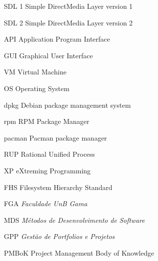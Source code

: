 \begin{siglas}
  \item[SDL 1] Simple DirectMedia Layer version 1
  \item[SDL 2] Simple DirectMedia Layer version 2
  \item[API] Application Program Interface
  \item[GUI] Graphical User Interface
  \item[VM] Virtual Machine
  \item[OS] Operating System
  \item[dpkg] Debian package management system
  \item[rpm] RPM Package Manager
  \item[pacman] Pacman package manager
  \item[RUP] Rational Unified Process
  \item[XP] eXtreming Programming
  \item[FHS] Filesystem Hierarchy Standard
  \item[FGA] \textit{Faculdade UnB Gama}
  \item[MDS] \textit{M\'etodos de Desenvolvimento de Software}
  \item[GPP] \textit{Gest\~ao de Portfolios e Projetos}
  \item[PMBoK] Project Management Body of Knowledge
\end{siglas}
